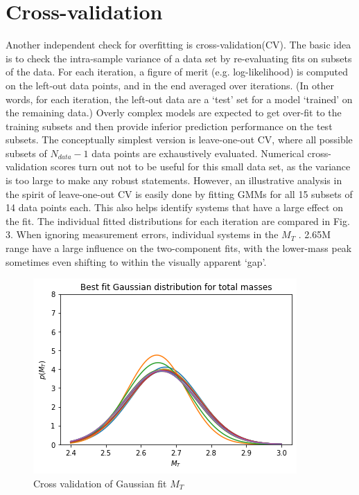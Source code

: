 \documentclass[journal,12pt,twocolumn]{IEEEtran}
\begin{document}
\section{Cross-validation}
Another independent check for overfitting is cross-validation(CV). The basic idea is to check the intra-sample variance of a data set by re-evaluating fits on subsets of the data. For each iteration, a figure of merit (e.g. log-likelihood) is computed on the left-out data points, and in the end averaged over iterations. (In other words, for each iteration, the left-out data are a ‘test’ set for a model ‘trained’ on the remaining data.) Overly complex models are expected to get over-fit to the training subsets and then provide inferior prediction performance on the test subsets. The conceptually simplest version is leave-one-out CV, where all possible subsets of $N_{data}-1$ data points are exhaustively evaluated. Numerical cross-validation scores turn out not to be useful for this small data set, as the variance is too large to make any robust statements. However, an illustrative analysis in the spirit of leave-one-out CV is easily done by fitting GMMs for all 15 subsets of 14 data points each. This also helps identify systems that have a large effect on the fit. The individual fitted distributions for each iteration are compared in Fig. 3. When ignoring measurement errors, individual systems in the $M_T$ . 2.65M range have a large influence on the two-component fits, with the lower-mass peak sometimes even shifting to within the visually apparent ‘gap’.
\begin{figure}[ht!]
\centering
\includegraphics[scale=0.6]{fig/cv_gau.png}
\caption{Cross validation of Gaussian fit $M_T$}
\end{figure}
\end{document}
